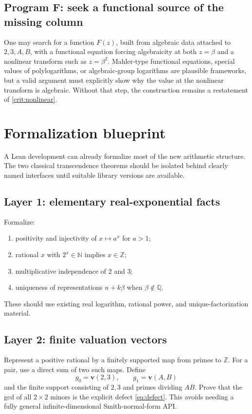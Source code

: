 \documentclass[11pt]{article}
\numberwithin{equation}{section}
\theoremstyle{definition}
\newcommand{\Q}{\mathbb{Q}}
\newcommand{\Z}{\mathbb{Z}}
\newcommand{\N}{\mathbb{N}}
\newcommand{\val}{\boldsymbol{v}}
\begin{document}
\subsection{Program F: seek a functional source of the missing column}

One may search for a function \(F(z)\), built from algebraic data attached to \(2,3,A,B\), with a functional equation forcing algebraicity at both \(z=\beta\) and a nonlinear transform such as \(z=\beta^2\). Mahler-type functional equations, special values of polylogarithms, or algebraic-group logarithms are plausible frameworks, but a valid argument must explicitly show why the value at the nonlinear transform is algebraic. Without that step, the construction remains a restatement of \cref{crit:nonlinear}.

\section{Formalization blueprint}

A Lean development can already formalize most of the new arithmetic structure. The two classical transcendence theorems should be isolated behind clearly named interfaces until suitable library versions are available.

\subsection{Layer 1: elementary real-exponential facts}

Formalize:
\begin{enumerate}
\item positivity and injectivity of \(x\mapsto a^x\) for \(a>1\);
\item rational \(x\) with \(2^x\in\N\) implies \(x\in\Z\);
\item multiplicative independence of \(2\) and \(3\);
\item uniqueness of representations \(n+k\beta\) when \(\beta\notin\Q\).
\end{enumerate}
These should use existing real logarithm, rational power, and unique-factorization material.

\subsection{Layer 2: finite valuation vectors}

Represent a positive rational by a finitely supported map from primes to \(\Z\). For a pair, use a direct sum of two such maps. Define
\[
 g_0=\val(2,3),\qquad g_1=\val(A,B)
\]
and the finite support consisting of \(2,3\) and primes dividing \(AB\). Prove that the gcd of all \(2\times2\) minors is the explicit defect \eqref{eq:defect}. This avoids needing a fully general infinite-dimensional Smith-normal-form API.
\end{document}
